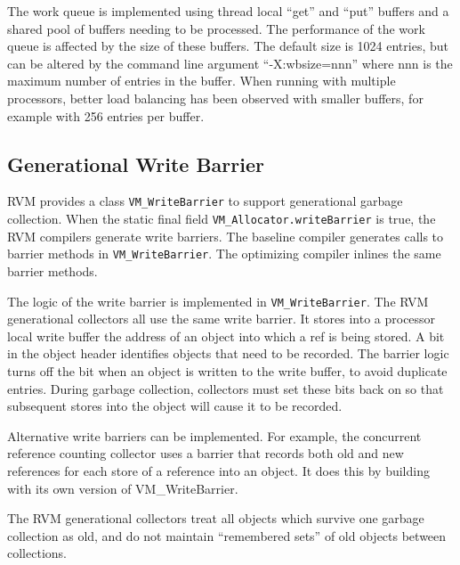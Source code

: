The work queue is implemented using thread local ``get'' and ``put'' buffers
and a shared pool of buffers needing to be processed.  The performance of the
work queue is affected by the size of these buffers.  The default size is 1024 
entries, but can be altered by the command line argument ``-X:wbsize=nnn'' where
nnn is the maximum number of entries in the buffer.  When running with multiple
processors, better load balancing has been observed with smaller buffers, for
example with 256 entries per buffer.  

\subsection{Generational Write Barrier} \label{sssec:writebarrier}
RVM provides a class {\tt VM\_WriteBarrier} to support generational garbage 
collection.
When the static 
final field {\tt VM\_Allocator.writeBarrier} is true,
the RVM compilers generate write barriers.
The baseline compiler generates calls to barrier methods in {\tt VM\_WriteBarrier}.
The optimizing compiler inlines the same barrier methods.

The logic of the write barrier is implemented in {\tt VM\_WriteBarrier}.
The RVM generational collectors all use the same write barrier.
It stores into a processor local write buffer the address of an object
into which a ref is being stored.
A bit in the object header identifies objects that need to be recorded.
The barrier logic turns off the bit when an object is written to the write
buffer, to avoid duplicate entries.
During garbage collection, collectors must set these bits back on so that
subsequent stores into the object will cause it to be recorded.

Alternative write barriers can be implemented. For example, the concurrent
reference counting collector uses a barrier that records both old and new
references for each store of a reference into an object. It does this
by building with its own version of VM\_WriteBarrier.

The RVM generational collectors treat all objects which
survive one garbage collection as old, and do not maintain ``remembered sets''
of old objects between collections.

